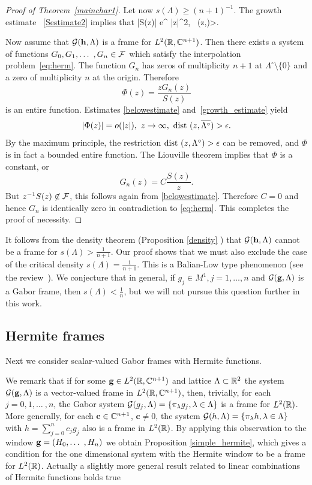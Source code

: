 \documentclass[12pt]{amsart}
\begin{document}
\begin{proof}[Proof of Theorem~\ref{mainchar1}]
  \smallskip
  
 Let now $s(\Lambda)\geq (n+1)^{-1}$. The growth estimate~ 
  \eqref{Sestimate2} implies that 
  \beq
  \label{belowestimate}
   |S(z)| \geq \const  e^{\frac {}  |z|^2},
 \quad {} \,  \dist(z,\ola)>\epsilon.
\eeq
 
Now assume that  $\mathcal{G}(\mathbf {h}, \Lambda)$ is a frame for $L^2(\mathbb{R},\mathbb{C}
^{n+1})$. Then  there exists a system of functions
$G_0, G_1,\ldots \ ,G_n\in \mathcal{F}$ which satisfy the interpolation
problem~\eqref{eq:herm}. The function 
$G_n$ has zeros of multiplicity $n+1$ at $\Lambda^\circ\setminus \{0\}$ and
a zero of multiplicity $n$ at the origin. Therefore 
\[
\Phi(z)= \frac {zG_n(z)}{S(z)}
\]
is an entire function. Estimates \eqref{belowestimate}
and~\eqref{growth_estimate}  yield 
\[
|\Phi(z)| = o(|z|), \ z \to \infty, \ \text{dist}\ (z, \overline{\Lambda^\circ}) >\epsilon.
\]
By the maximum principle, the  restriction  
$ \text{dist}\ (z, \Lambda^\circ) >\epsilon$   can be removed,
and $\Phi $ is in fact a bounded entire function. The
Liouville theorem implies that  $\Phi$ is a constant, or 
\[
G_n(z)= C \frac{S(z)}z.
\]
But  $z^{-1}S(z) \not \in \mathcal{F} $, this follows again from \eqref {belowestimate}. Therefore
$C=0$ and hence $G_n$ is identically zero in contradiction to  \eqref{eq:herm}. This completes the proof of necessity.
\end{proof}

 It follows from the density theorem
(Proposition \ref{density} ) that $\mathcal{G} (\mathbf {h} , \Lambda )$ cannot be a frame for
$s(\Lambda ) > \frac{1}{n+1}$. Our proof shows that we must also
exclude the case of the critical density $s(\Lambda ) =
\frac{1}{n+1}$. This is  a Balian-Low type phenomenon (see the
review~\cite{BHW95}). We conjecture that  in general, if $g_j \in M^1,
j=1, \dots , n$ and $\mathcal{G} (\mathbf {g} , \Lambda )$ is a Gabor frame, then
$s(\Lambda ) < \frac{1}{n}$,   
but we will not pursue this question
further in this work. 

 


\subsection{Hermite frames}
Next  we consider scalar-valued Gabor frames with Hermite
functions.  
 
We remark that if for some $\mathbf {g} \in L^2(\mathbb{R}, \mathbb{C}^{n+1})$ and lattice 
$\Lambda \subset \mathbb{R}^2$ the system 
 $\mathcal{G}(\mathbf {g}, \Lambda)$ is a vector-valued frame in 
$L^2(\mathbb{R}, \mathbb{C}^{n+1})$, then, trivially,  for each $j=0,1,\ldots \ ,n$, the Gabor system
$\mathcal{G}(g_j, \Lambda)=\{\pi_\lambda g_j, \lambda \in \Lambda\}$ is a frame for 
$L^2(\mathbb{R})$. More generally, for each 
 $\mathbf{c}\in \mathbb{C} ^{n+1}$,  $ \mathbf{c}\neq 0$, the system
 $\mathcal{G}(h, \Lambda)=\{\pi_\lambda h, \lambda \in \Lambda\}$  with 
$h = \sum _{j=0}^n c_j g_j$  also is a frame in  $L^2(\mathbb{R})$.
By applying this observation to the window $\mathbf {g} = (H_0,\ldots \ , H_n)$
we obtain Proposition \ref{simple_hermite}, which gives
a condition for the one dimensional system with the Hermite window to be a frame for  $L^2(\mathbb{R})$. Actually a    slightly more general result   related to   linear
combinations of Hermite functions holds true
\end{document}
